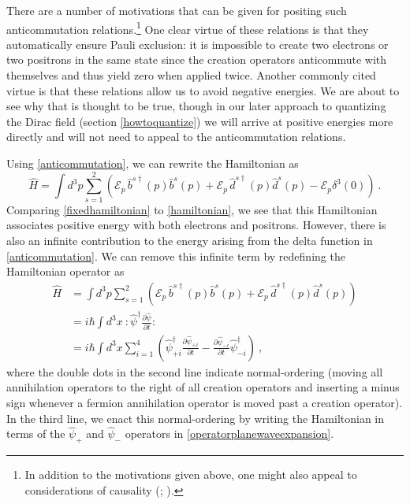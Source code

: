 \documentclass[onecolumn,secnumarabic,amsmath,amssymb,balancelastpage,nofootinbib]{article}
\begin{document}
There are a number of motivations that can be given for positing such anticommutation relations.\footnote{In addition to the motivations given above, one might also appeal to considerations of causality (\citealp[ch.\ 3]{peskinschroeder}; \citealp[sec.\ 5.5]{weinbergQFT}).}  One clear virtue of these relations is that they automatically ensure Pauli exclusion: it is impossible to create two electrons or two positrons in the same state since the creation operators anticommute with themselves and thus yield zero when applied twice.  Another commonly cited virtue is that these relations allow us to avoid negative energies.  We are about to see why that is thought to be true, though in our later approach to quantizing the Dirac field (section \ref{howtoquantize}) we will arrive at positive energies more directly and will not need to appeal to the anticommutation relations.


Using \eqref{anticommutation}, we can rewrite the Hamiltonian as
\begin{equation}
\widehat{H}=\int{d^3 p \sum_{s=1}^2  \left(\mathcal{E}_p\,\widehat{b}^{s\dagger}(p)\widehat{b}^s(p)+\mathcal{E}_p\,\widehat{d}^{s\dagger}(p)\widehat{d}^{s}(p)-\mathcal{E}_p \delta^3(0)\right)}
\ .
\label{fixedhamiltonian}
\end{equation}
Comparing \eqref{fixedhamiltonian} to \eqref{hamiltonian}, we see that this Hamiltonian associates positive energy with both electrons and positrons.  However, there is also an infinite contribution to the energy arising from the delta function in \eqref{anticommutation}.  We can remove this infinite term by redefining the Hamiltonian operator as
\begin{align}
\widehat{H}&=\int{d^3 p \sum_{s=1}^2 \left(\mathcal{E}_p\,\widehat{b}^{s\dagger}(p)\widehat{b}^s(p)+\mathcal{E}_p\,\widehat{d}^{s\dagger}(p)\widehat{d}^{s}(p)\right)}
\nonumber
\\
&=i \hbar \int{d^3 x \ :\widehat{\psi}^\dagger\frac{\partial \widehat{\psi}}{\partial t}:}
\nonumber
\\
&=i \hbar\int{d^3 x  \sum_{i=1}^4\left(\widehat{\psi}^{\dagger}_{+i}\frac{\partial \widehat{\psi}_{+i}}{\partial t}-\frac{\partial \widehat{\psi}_{-i}}{\partial t}\widehat{\psi}^{\dagger}_{-i} \right)}
\ ,
\label{fullyfixedhamiltonian}
\end{align}
where the double dots in the second line indicate normal-ordering (moving all annihilation operators to the right of all creation operators and inserting a minus sign whenever a fermion annihilation operator is moved past a creation operator).  In the third line, we enact this normal-ordering by writing the Hamiltonian in terms of the $\widehat{\psi}_{+}$ and $\widehat{\psi}_{-}$ operators in \eqref{operatorplanewaveexpansion}.
\end{document}
